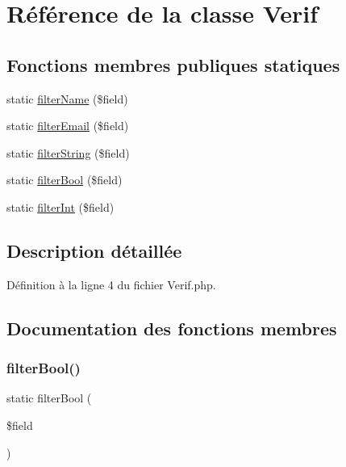 \hypertarget{class_app_1_1_verif}{}\section{Référence de la classe Verif}
\label{class_app_1_1_verif}
\subsection*{Fonctions membres publiques statiques}
\begin{DoxyCompactItemize}
\item 
static \hyperlink{class_app_1_1_verif_ae66ae460929735528668ff5a64355e1c}{filter\+Name} (\$field)
\item 
static \hyperlink{class_app_1_1_verif_ad27d2a83b777170b7a7309c28b0b6976}{filter\+Email} (\$field)
\item 
static \hyperlink{class_app_1_1_verif_a99f773813353109ce02b4796ddd49467}{filter\+String} (\$field)
\item 
static \hyperlink{class_app_1_1_verif_acaebb8c6ab397efcf8d4c0e29b2b3357}{filter\+Bool} (\$field)
\item 
static \hyperlink{class_app_1_1_verif_abb832f72a01d33d452acfc2f67bc776f}{filter\+Int} (\$field)
\end{DoxyCompactItemize}


\subsection{Description détaillée}


Définition à la ligne 4 du fichier Verif.\+php.



\subsection{Documentation des fonctions membres}
\mbox{\label{class_app_1_1_verif_acaebb8c6ab397efcf8d4c0e29b2b3357}} 
\subsubsection{\texorpdfstring{filter\+Bool()}{filterBool()}}
{\footnotesize\ttfamily static filter\+Bool (\begin{DoxyParamCaption}\item[{}]{\$field }\end{DoxyParamCaption})\hspace{0.3cm}{\ttfamily [static]}}



